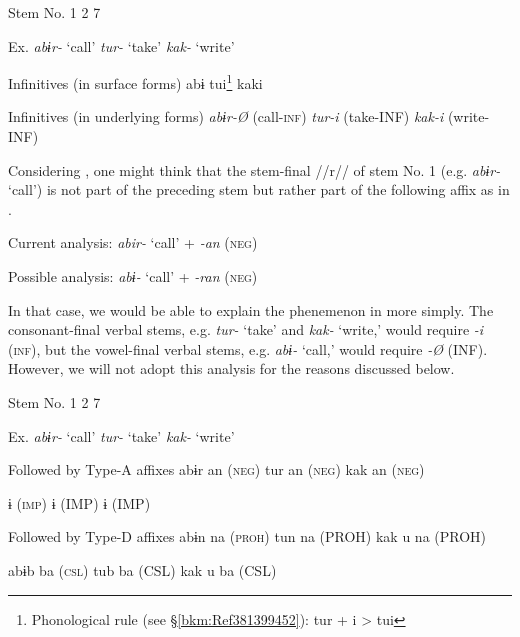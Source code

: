 \begin{table}
\caption{\label{tab:key:66}Infinitives of the verbal stems No. 1, 2, and 7}

Stem No.  1    2    7

Ex.  \textit{abɨr-} ‘call’    \textit{tur-} ‘take’    \textit{kak-} ‘write’

Infinitives (in surface forms)  abɨ      tui\footnote{Phonological rule (see §\ref{bkm:Ref381399452}): tur + i > tui}      kaki

Infinitives (in underlying forms)  \textit{abɨr-Ø}  (call-\textsc{inf})    \textit{tur-i}  (take-INF)    \textit{kak-i}  (write-INF)
\end{table}

Considering , one might think that the stem-final //r// of stem No. 1 (e.g. \textit{abɨr-} ‘call’) is not part of the preceding stem but rather part of the following affix as in .

\ea\label{ex:8-20}
  Current analysis:  \textit{abir-}  ‘call’  +  \textit{{}-an}  (\textsc{neg})

  Possible analysis:  \textit{abɨ-}  ‘call’  +  \textit{{}-ran}  (\textsc{neg})

In that case, we would be able to explain the phenemenon in  more simply. The consonant-final verbal stems, e.g. \textit{tur-} ‘take’ and \textit{kak-} ‘write,’ would require \textit{{}-i} (\textsc{inf}), but the vowel-final verbal stems, e.g. \textit{abɨ-} ‘call,’ would require \textit{{}-Ø} (INF). However, we will not adopt this analysis for the reasons discussed below.

\begin{table}
\caption{\label{tab:key:67}. Combinations of verbal roots and Type-A affixes and Type-D affixes}

Stem No.  1    2    7

Ex.  \textit{abɨr-} ‘call’    \textit{tur-} ‘take’    \textit{kak-} ‘write’

Followed by Type-A affixes  abɨr    an (\textsc{neg})    tur    an (\textsc{neg})    kak    an (\textsc{neg})

      ɨ (\textsc{imp})        ɨ (IMP)        ɨ (IMP)

Followed by Type-D affixes  abɨn    na (\textsc{proh})    tun    na (PROH)    kak  u  na (PROH)

  abɨb    ba (\textsc{csl})    tub    ba (CSL)    kak  u  ba (CSL)
\end{table}


